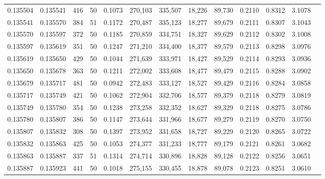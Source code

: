 \begin{tabular}{rrrrrrrrrrrrr}
0.135504 & 0.135541 &   416 &  50 &                                     0.1073 & 270,103 & 335,507 &  18,226 &  89,730 & 0.2110 & 0.8312 & 3.1078 \\
0.135541 & 0.135570 &   384 &  51 &                                     0.1172 & 270,487 & 335,123 &  18,277 &  89,679 & 0.2111 & 0.8307 & 3.1043 \\
0.135570 & 0.135597 &   372 &  50 &                                     0.1185 & 270,859 & 334,751 &  18,327 &  89,629 & 0.2112 & 0.8302 & 3.1008 \\
0.135597 & 0.135619 &   351 &  50 &                                     0.1247 & 271,210 & 334,400 &  18,377 &  89,579 & 0.2113 & 0.8298 & 3.0976 \\
0.135619 & 0.135650 &   429 &  50 &                                     0.1044 & 271,639 & 333,971 &  18,427 &  89,529 & 0.2114 & 0.8293 & 3.0936 \\
0.135650 & 0.135678 &   363 &  50 &                                     0.1211 & 272,002 & 333,608 &  18,477 &  89,479 & 0.2115 & 0.8288 & 3.0902 \\
0.135679 & 0.135717 &   481 &  50 &                                     0.0942 & 272,483 & 333,127 &  18,527 &  89,429 & 0.2116 & 0.8284 & 3.0858 \\
0.135717 & 0.135749 &   421 &  50 &                                     0.1062 & 272,904 & 332,706 &  18,577 &  89,379 & 0.2118 & 0.8279 & 3.0819 \\
0.135749 & 0.135780 &   354 &  50 &                                     0.1238 & 273,258 & 332,352 &  18,627 &  89,329 & 0.2118 & 0.8275 & 3.0786 \\
0.135780 & 0.135807 &   386 &  50 &                                     0.1147 & 273,644 & 331,966 &  18,677 &  89,279 & 0.2119 & 0.8270 & 3.0750 \\
0.135807 & 0.135832 &   308 &  50 &                                     0.1397 & 273,952 & 331,658 &  18,727 &  89,229 & 0.2120 & 0.8265 & 3.0722 \\
0.135832 & 0.135863 &   425 &  50 &                                     0.1053 & 274,377 & 331,233 &  18,777 &  89,179 & 0.2121 & 0.8261 & 3.0682 \\
0.135863 & 0.135887 &   337 &  51 &                                     0.1314 & 274,714 & 330,896 &  18,828 &  89,128 & 0.2122 & 0.8256 & 3.0651 \\
0.135887 & 0.135923 &   441 &  50 &                                     0.1018 & 275,155 & 330,455 &  18,878 &  89,078 & 0.2123 & 0.8251 & 3.0610 \\

\end{tabular}
